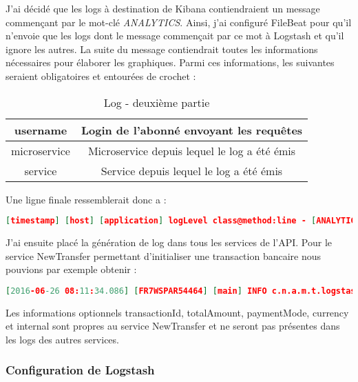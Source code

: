 	J'ai décidé que les logs à destination de Kibana contiendraient un message commençant par le mot-clé \textit{ANALYTICS}. Ainsi, j'ai configuré FileBeat pour qu'il n'envoie que les logs dont le message commençait par ce mot à Logstash et qu'il ignore les autres. La suite du message contiendrait toutes les informations nécessaires pour élaborer les graphiques. Parmi ces informations, les suivantes seraient obligatoires et entourées de crochet :
	
	\begin{table}[h!]
	\center
	\begin{tabular}{| c | c |}
     \hline
     username & Login de l'abonné envoyant les requêtes \\ \hline
     microservice & Microservice depuis lequel le log a été émis \\ \hline
     service & Service depuis lequel le log a été émis \\
     \hline
	\end{tabular}
	\caption{Log - deuxième partie}
	\end{table}
	
	Une ligne finale ressemblerait donc a :
	
\begin{lstlisting}[language=json]
 [timestamp] [host] [application] logLevel class@method:line - [ANALYTICS] [username] [microservice] [service] info1=valeur1 info2=valeur2 ... infoN=valeurN 
\end{lstlisting}
	
	J'ai ensuite placé la génération de log dans tous les services de l'API. Pour le service NewTransfer permettant d'initialiser une transaction bancaire nous pouvions par exemple obtenir :
	
\begin{lstlisting}[language=json]
[2016-06-26 08:11:34.086] [FR7WSPAR54464] [main] INFO c.n.a.m.t.logstash.LogStashTests@testNewTransfer:36 - [ANALYTICS] [COCKZAO72] [Transaction] [NewTransfer] transactionId=13072409724 totalAmount=1000 paymentMode=SINGLE currency=EUR internal=true
\end{lstlisting}

	Les informations optionnels transactionId, totalAmount, paymentMode, currency et internal sont propres au service NewTransfer et ne seront pas présentes dans les logs des autres services. 
	
	\subsubsection{Configuration de Logstash}
	
